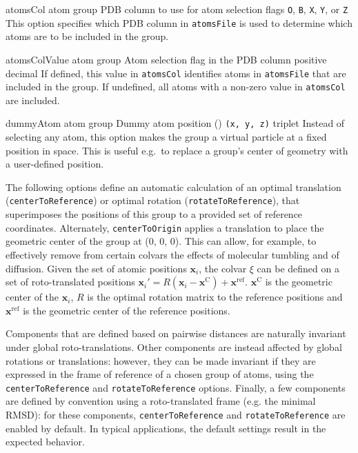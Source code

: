 \begin{itemize}
{\item %
  \key%
    {atomsCol}{%
    atom group}{%
    PDB column to use for atom selection flags}{%
    \texttt{O}, \texttt{B}, \texttt{X}, \texttt{Y}, or \texttt{Z}}{%
    This option specifies which PDB column in \texttt{atomsFile} is used to determine which atoms are to be included in the group.
  }

\item %
  \key%
    {atomsColValue}{%
    atom group}{%
    Atom selection flag in the PDB column}{%
    positive decimal}{%
    If defined, this value in \texttt{atomsCol} identifies atoms in \texttt{atomsFile} that are included in the group.
    If undefined, all atoms with a non-zero value in \texttt{atomsCol} are included.}
}

\item %
  \key
    {dummyAtom}{%
    atom group}{%
    Dummy atom position (\lengthunit)}{%
    \texttt{(x, y, z)} triplet}{%
    Instead of selecting any atom, this option makes the group a virtual particle at a fixed position in space.  This is useful e.g.~to replace a group's center of geometry with a user-defined position.}

\end{itemize}


The following options define an automatic calculation of an optimal translation (\texttt{centerToReference}) or optimal rotation (\texttt{rotateToReference}), that superimposes the positions of this group to a provided set of reference coordinates.
Alternately, \texttt{centerToOrigin} applies a translation to place the geometric center of the group at (0, 0, 0).
This can allow, for example, to effectively remove from certain colvars the effects of molecular tumbling and of diffusion.
Given the set of atomic positions $\mathbf{x}_{i}$, the colvar $\xi$ can be defined on a set of roto-translated positions $\mathbf{x}_{i}' = R(\mathbf{x}_{i} - \mathbf{x}^{\mathrm{C}}) + \mathbf{x}^{\mathrm{ref}}$.
$\mathbf{x}^{\mathrm{C}}$ is the geometric center of the $\mathbf{x}_{i}$, $R$ is the optimal rotation matrix to the reference positions and $\mathbf{x}^{\mathrm{ref}}$ is the geometric center of the reference positions.

Components that are defined based on pairwise distances are naturally invariant under global roto-translations.
Other components are instead affected by global rotations or translations: however, they can be made invariant if they are expressed in the frame of reference of a chosen group of atoms, using the \texttt{centerToReference} and \texttt{rotateToReference} options.
Finally, a few components are defined by convention using a roto-translated frame (e.g. the minimal RMSD): for these components, \texttt{centerToReference} and \texttt{rotateToReference} are enabled by default.
In typical applications, the default settings result in the expected behavior.

